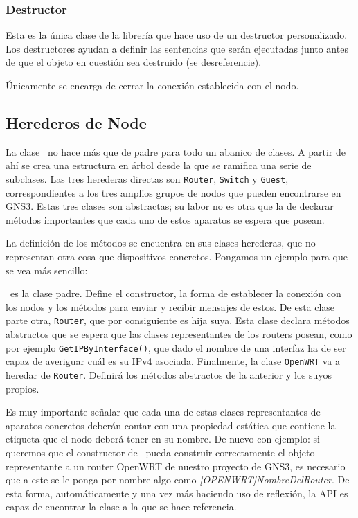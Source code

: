 \subsubsection{Destructor}
Esta es la única clase de la librería que hace uso de un destructor personalizado. Los destructores ayudan a definir las sentencias que serán ejecutadas junto antes de que el objeto en cuestión sea destruido (se desreferencie).

Únicamente se encarga de cerrar la conexión establecida con el nodo.

\subsection{Herederos de Node}
La clase \NODE~no hace más que de padre para todo un abanico de clases. A partir de ahí se crea una estructura en árbol desde la que se ramifica una serie de subclases. Las tres herederas directas son \texttt{Router}, \texttt{Switch} y \texttt{Guest}, correspondientes a los tres amplios grupos de nodos que pueden encontrarse en GNS3. Estas tres clases son abstractas; su labor no es otra que la de declarar métodos importantes que cada uno de estos aparatos se espera que posean.

La definición de los métodos se encuentra en sus clases herederas, que no representan otra cosa que dispositivos concretos. Pongamos un ejemplo para que se vea más sencillo:

\NODE~es la clase padre. Define el constructor, la forma de establecer la conexión con los nodos y los métodos para enviar y recibir mensajes de estos. De esta clase parte otra, \texttt{Router}, que por consiguiente es hija suya. Esta clase declara métodos abstractos que se espera que las clases representantes de los routers posean, como por ejemplo \texttt{GetIPByInterface()}, que dado el nombre de una interfaz ha de ser capaz de averiguar cuál es su IPv4 asociada. Finalmente, la clase \texttt{OpenWRT} va a heredar de \texttt{Router}. Definirá los métodos abstractos de la anterior y los suyos propios.

Es muy importante señalar que cada una de estas clases representantes de aparatos concretos deberán contar con una propiedad estática que contiene la etiqueta que el nodo deberá tener en su nombre. De nuevo con ejemplo: si queremos que el constructor de \GNSCS~pueda construir correctamente el objeto representante a un router OpenWRT de nuestro proyecto de GNS3, es necesario que a este se le ponga por nombre algo como \textit{[OPENWRT]NombreDelRouter}. De esta forma, automáticamente y una vez más haciendo uso de reflexión, la API es capaz de encontrar la clase a la que se hace referencia.

